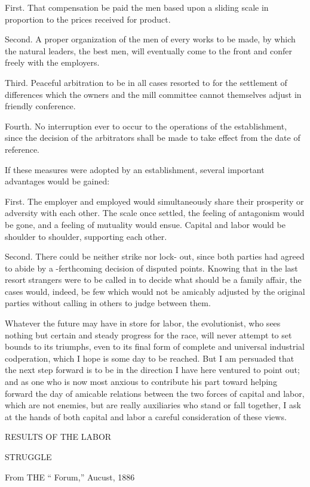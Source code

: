 \documentclass[11pt,openany]{book}
\begin{document}
First. That compensation be paid the men based upon a sliding scale in proportion to the prices received for product.

Second. A proper organization of the men of every works to be made, by which the natural leaders, the best men, will eventually come to the front and confer freely with the employers.

Third. Peaceful arbitration to be in all cases resorted to for the settlement of differences which the owners and the mill committee cannot themselves adjust in friendly conference.

Fourth. No interruption ever to occur to the operations of the establishment, since the decision of the arbitrators shall be made to take effect from the date of reference.

If these measures were adopted by an establishment, several important advantages would be gained:

First. The employer and employed would simultaneously share their prosperity or adversity with each other. The scale once settled, the feeling of antagonism would be gone, and a feeling of mutuality would ensue. Capital and labor would be shoulder to shoulder, supporting each other.

Second. There could be neither strike nor lock- out, since both parties had agreed to abide by a -ferthcoming decision of disputed points. Knowing that in the last resort strangers were to be called in to decide what should be a family affair, the cases would, indeed, be few which would not be amicably adjusted by the original parties without calling in others to judge between them.

Whatever the future may have in store for labor, the evolutionist, who sees nothing but certain and steady progress for the race, will never attempt to set bounds to its triumphs, even to its final form of complete and universal industrial codperation, which I hope is some day to be reached. But I am persuaded that the next step forward is to be in the direction I have here ventured to point out; and as one who is now most anxious to contribute his part toward helping forward the day of amicable relations between the two forces of capital and labor, which are not enemies, but are really auxiliaries who stand or fall together, I ask at the hands of both capital and labor a careful consideration of these views.

RESULTS OF THE LABOR

STRUGGLE

From THE `` Forum,'' Aucust, 1886
\end{document}
